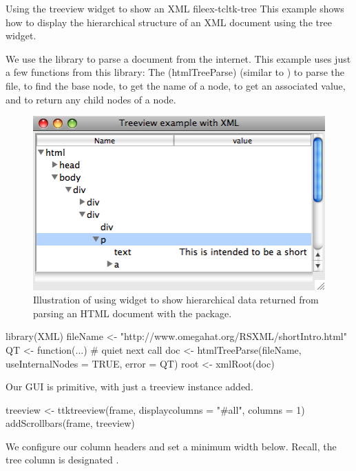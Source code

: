 \begin{example}{Using the treeview widget to show an XML file}{ex-tcltk-tree}
This example shows how to display the hierarchical structure of an XML
document using the tree widget.

We use the  library to parse a document from the
internet. This example uses just a few functions from this library:
The \function(htmlTreeParse) (similar to ) to parse the file, 
 to find the base node,
 to get the name of a node, 
 to get an associated value, and
 to return any child nodes of a node.



\begin{figure}
  \centering
  \includegraphics[width=.7\textwidth]{fig-tcltk-xml-viewer.png}
  \caption{Illustration of using  widget to show
    hierarchical data returned from parsing an HTML document with the
     package.}
  \label{fig:fig-tcltk-xml-viewer}
\end{figure}
\begin{Schunk}
\begin{Sinput}
 library(XML)
 fileName <- "http://www.omegahat.org/RSXML/shortIntro.html"
 QT <- function(...) {}  # quiet next call
 doc <- htmlTreeParse(fileName, useInternalNodes = TRUE, error = QT)
 root <- xmlRoot(doc)
\end{Sinput}
\end{Schunk}
Our GUI is primitive, with just a treeview instance added.
\begin{Schunk}
\begin{Sinput}
 treeview <- ttktreeview(frame, displaycolumns = "#all", columns = 1)
 addScrollbars(frame, treeview)                    
\end{Sinput}
\end{Schunk}

We configure our column headers and set a minimum
width below. Recall, the tree column is designated .
\begin{Schunk}
\end{Schunk}


\end{example}
